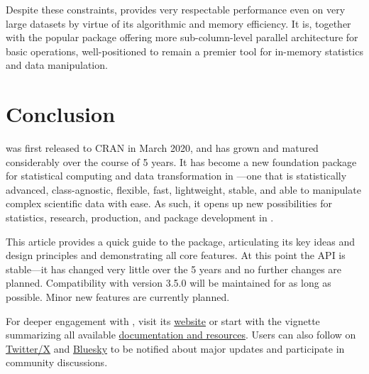 \documentclass[article]{jss} %
\begin{document}
Despite these constraints,  provides very respectable performance even on very large datasets by virtue of its algorithmic and memory efficiency. It is, together with the popular  package offering more sub-column-level parallel architecture for basic operations, well-positioned to remain a premier tool for in-memory statistics and data manipulation. %


\section{Conclusion} \label{sec:conclusion}

 was first released to CRAN in March 2020, and has grown and matured considerably over the course of 5 years. It has become a new foundation package for statistical computing and data transformation in ---one that is statistically advanced, class-agnostic, flexible, fast, lightweight, stable, and able to manipulate complex scientific data with ease. As such, it opens up new possibilities for statistics, research, production, and package development in . \newline %

This article provides a quick guide to the package, articulating its key ideas and design principles and demonstrating all core features. At this point the API is stable---it has changed very little over the 5 years and no further changes are planned. Compatibility with  version 3.5.0 will be maintained for as long as possible. Minor new features are currently planned. \newline

For deeper engagement with , visit its \href{https://sebkrantz.github.io/collapse/index.html}{website} or start with the vignette summarizing all available \href{https://sebkrantz.github.io/collapse/articles/collapse_documentation.html}{documentation and resources}. Users can also follow  on \href{https://x.com/collapse_R}{Twitter/X} and \href{https://bsky.app/profile/rcollapse.bsky.social}{Bluesky} to be notified about major updates and participate in community discussions. \newline
\end{document}
